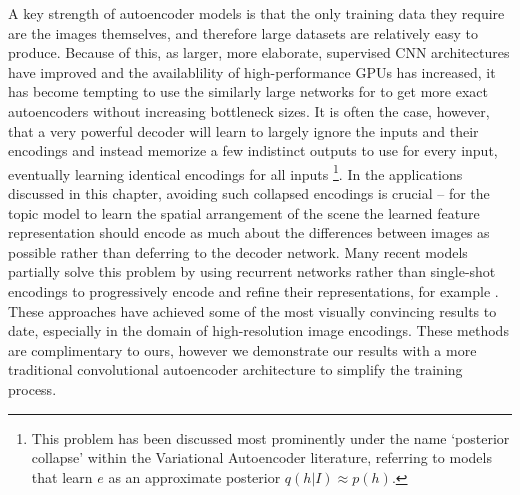 A key strength of autoencoder models is that the only training data they require are the images themselves, and therefore large datasets are relatively easy to produce. Because of this, as larger, more elaborate, supervised CNN architectures have improved and the availablility of high-performance GPUs has increased, it has become tempting to use the similarly large networks for to get more exact autoencoders without increasing bottleneck sizes. It is often the case, however, that a very powerful decoder will learn to largely ignore the inputs and their encodings and instead memorize a few indistinct outputs to use for every input, eventually learning identical encodings for all inputs \citep{vincent2010stacked,Chen2016}\footnote{This problem has been discussed most prominently under the name `posterior collapse' within the Variational Autoencoder literature, referring to models that learn $e$ as an approximate posterior $q(h | I) \approx p(h)$.}. In the applications discussed in this chapter, avoiding such collapsed encodings is crucial -- for the topic model to learn the spatial arrangement of the scene the learned feature representation should encode as much about the differences between images as possible rather than deferring to the decoder network. Many recent models partially solve this problem by using recurrent networks rather than single-shot encodings to progressively encode and refine their representations, for example \citep{OordPixelCNN,Chen2016,Gregor2016}. These approaches have achieved some of the most visually convincing results to date, especially in the domain of high-resolution image encodings. These methods are complimentary to ours, however we demonstrate our results with a more traditional convolutional autoencoder architecture to simplify the training process.

